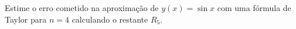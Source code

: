 Estime o erro cometido na aproximação de $y(x) = \sin x$ com uma fórmula de Taylor para $n = 4$ calculando o restante $R_5$.


